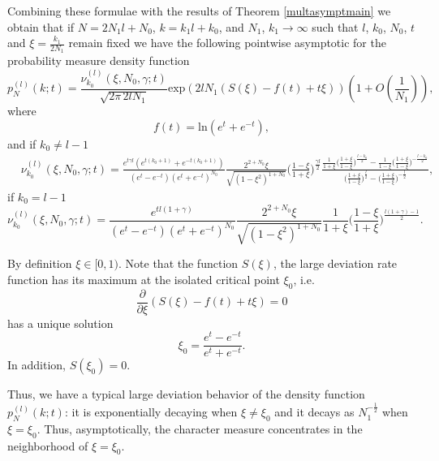 \documentclass[11pt]{amsart}
\begin{document}
Combining these formulae with the results of Theorem \ref{multasymptmain} we obtain that if $N=2N_1l+N_0$, $k=k_1l+k_0$, and $N_1$, $k_1\to\infty$ such that $l$, $k_0$, $N_0$, $t$ and $\xi=\frac{k_1}{2N_1}$ remain fixed we have the following pointwise asymptotic for the probability measure density function
\begin{equation}\label{charas}
    p^{(l)}_N(k;t)=\frac{\nu_{k_0}^{(l)}(\xi,N_0,\gamma;t)}{\sqrt{2\pi\, 2lN_1}}\mathrm{exp}(2lN_1 (S(\xi)-f(t)+t\xi))\left(1+O\left(\frac{1}{N_1}\right)\right),
\end{equation}
where
\begin{equation*}
	f(t)=\mathrm{ln}(e^t+e^{-t}),
\end{equation*}
and if $k_0\neq l-1$
\begin{eqnarray*}
    &\nu_{k_0}^{(l)}(\xi,N_0,\gamma;t)=\frac{e^{t\gamma l}(e^{t(k_0+1)}+e^{-t(k_0+1)})}{(e^{t}-e^{-t})(e^t+e^{-t})^{N_0}}\frac{2^{2+N_0}\xi}{\sqrt{ (1-\xi^2)^{1+N_0}}}\Big(\frac{1-\xi}{1+\xi}\Big)^{\frac{\gamma l}{2}}\frac{\frac{1}{1+\xi}\Big(\frac{1+\xi}{1-\xi}\Big)^{\frac{l-k_0}{2}}-\frac{1}{1-\xi}\Big(\frac{1+\xi}{1-\xi}\Big)^{-\frac{l-k_0}{2}}}{\Big(\frac{1+\xi}{1-\xi}\Big)^{\frac{l}{2}}-\Big(\frac{1+\xi}{1-\xi}\Big)^{-\frac{l}{2}}},
\end{eqnarray*}
if $k_0=l-1$
\begin{equation*}
    \nu_{k_0}^{(l)}(\xi,N_0,\gamma;t)=\frac{e^{tl(1+\gamma)}}{(e^{t}-e^{-t})(e^t+e^{-t})^{N_0}}\frac{2^{2+N_0}\xi}{\sqrt{(1-\xi^2)^{1+N_0}}} \frac{1}{1+\xi}\Big(\frac{1-\xi}{1+\xi}\Big)^{\frac{l(1+\gamma)-1}{2}}.
\end{equation*}


By definition $\xi\in[0,1)$. Note that the function $S(\xi)$, the large deviation rate function has its maximum at the isolated critical point $\xi_0$, i.e.
\begin{equation*}
\frac{\partial}{\partial\xi}(S(\xi)-f(t)+t\xi)=0
\end{equation*}
has a unique solution
\begin{equation}\label{xi0}
\xi_0=\frac{e^t-e^{-t}}{e^t+e^{-t}}.
\end{equation}
In addition, $S(\xi_0)=0$.


Thus, we have a typical large deviation behavior of the density function $p^{(l)}_N(k;t)$: it is exponentially decaying when $\xi\neq\xi_0$ and it decays as $N_1^{-\frac{1}{2}}$ when $\xi=\xi_0$. Thus, asymptotically, the character measure concentrates in the neighborhood of $\xi=\xi_0$.
\end{document}
